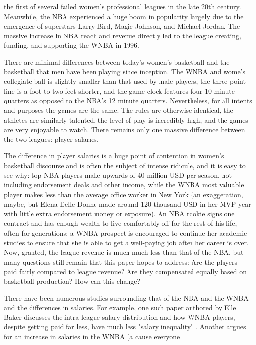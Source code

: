 \documentclass[12pt]{article}
\begin{document}
the first of several failed women’s professional leagues in the late 20th century. Meanwhile, the NBA experienced a huge boom in popularity largely due to 
the emergence of superstars Larry Bird, Magic Johnson, and Michael Jordan. The massive increase in NBA reach and revenue directly led to the league 
creating, funding, and supporting the WNBA in 1996.
\par
There are minimal differences between today's women’s basketball and the basketball that men have been playing since inception. The WNBA and wome's 
collegiate ball is slightly smaller than that used by male players, the three point line is a foot to two feet shorter, and the game clock features 
four 10 minute quarters as opposed to the NBA’s 12 minute quarters. Nevertheless, for all intents and purposes the games are the same. The rules are otherwise 
identical, the athletes are similarly talented, the level of play is incredibly high, and the games are very enjoyable to watch. There remains only one 
massive difference between the two leagues: player salaries.
\par
The difference in player salaries is a huge point of contention in women’s basketball discourse and is often the subject of intense ridicule, and it is 
easy to see why: top NBA players make upwards of 40 million USD per season, not including endorsement deals and other income, while the WNBA most valuable 
player makes less than the average office worker in New York (an exaggeration, maybe, but Elena Delle Donne made around 120 thousand USD in her MVP year 
with little extra endorsement money or exposure). An NBA rookie signs one contract and has enough wealth to live comfortably off for the rest of his life, 
often for generations; a WNBA prospect is encouraged to continue her academic studies to ensure that she is able to get a well-paying job after her career 
is over. Now, granted, the league revenue is much much less than that of the NBA, but many questions still remain that this paper hopes to address: Are 
the players paid fairly compared to league revenue? Are they compensated equally based on basketball production? How can this change?
\par
There have been numerous studies surrounding that of the NBA and the WNBA and the differences in salaries.
For example, one such paper authored by Elle Baker discusses the intra-league salary distribution and
how WNBA players, despite getting paid far less, have much less "salary inequality"
\citep{baker2020comparison}. Another argues for an increase in salaries in the WNBA (a cause everyone
\end{document}
